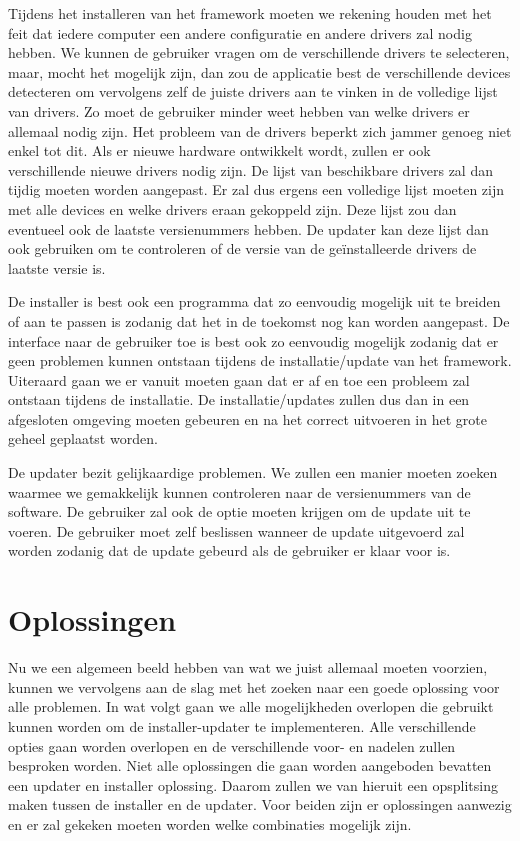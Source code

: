 \documentclass{article}
\begin{document}
Tijdens het installeren van het framework moeten we rekening houden met het feit dat iedere computer een andere configuratie en andere drivers zal nodig hebben.
We kunnen de gebruiker vragen om de verschillende drivers te selecteren, maar, mocht het mogelijk zijn, dan zou de applicatie best de verschillende devices detecteren om vervolgens zelf de juiste drivers aan te vinken in de volledige lijst van drivers.
Zo moet de gebruiker minder weet hebben van welke drivers er allemaal nodig zijn.
Het probleem van de drivers beperkt zich jammer genoeg niet enkel tot dit.
Als er nieuwe hardware ontwikkelt wordt, zullen er ook verschillende nieuwe drivers nodig zijn.
De lijst van beschikbare drivers zal dan tijdig moeten worden aangepast.
Er zal dus ergens een volledige lijst moeten zijn met alle devices en welke drivers eraan gekoppeld zijn.
Deze lijst zou dan eventueel ook de laatste versienummers hebben.
De updater kan deze lijst dan ook gebruiken om te controleren of de versie van de ge\"installeerde drivers de laatste versie is.

De installer is best ook een programma dat zo eenvoudig mogelijk uit te breiden of aan te passen is zodanig dat het in de toekomst nog kan worden aangepast. 
De interface naar de gebruiker toe is best ook zo eenvoudig mogelijk zodanig dat er geen problemen kunnen ontstaan tijdens de installatie/update van het framework.
Uiteraard gaan we er vanuit moeten gaan dat er af en toe een probleem zal ontstaan tijdens de installatie.
De installatie/updates zullen dus dan in een afgesloten omgeving moeten gebeuren en na het correct uitvoeren in het grote geheel geplaatst worden.

De updater bezit gelijkaardige problemen.
We zullen een manier moeten zoeken waarmee we gemakkelijk kunnen controleren naar de versienummers van de software.
De gebruiker zal ook de optie moeten krijgen om de update uit te voeren.
De gebruiker moet zelf beslissen wanneer de update uitgevoerd zal worden zodanig dat de update gebeurd als de gebruiker er klaar voor is.

\section{Oplossingen}
Nu we een algemeen beeld hebben van wat we juist allemaal moeten voorzien, kunnen we vervolgens aan de slag met het zoeken naar een goede oplossing voor alle problemen.
In wat volgt gaan we alle mogelijkheden overlopen die gebruikt kunnen worden om de installer-updater te implementeren.
Alle verschillende opties gaan worden overlopen en de verschillende voor- en nadelen zullen besproken worden.
Niet alle oplossingen die gaan worden aangeboden bevatten een updater en installer oplossing.
Daarom zullen we van hieruit een opsplitsing maken tussen de installer en de updater.
Voor beiden zijn er oplossingen aanwezig en er zal gekeken moeten worden welke combinaties mogelijk zijn.
\end{document}
